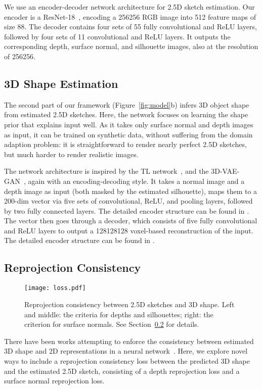 \documentclass{article}
\newcommand{\sect}[1]{Section~\ref{#1}}
\newcommand{\fig}[1]{Figure~\ref{#1}}
\begin{document}
We use an encoder-decoder network architecture for 2.5D sketch estimation. Our encoder is a ResNet-18~\citep{He2015}, encoding a 256256 RGB image into 512 feature maps of size 88. The decoder contains four sets of 55 fully convolutional and ReLU layers, followed by four sets of 11 convolutional and ReLU layers. It outputs the corresponding depth, surface normal, and silhouette images, also at the resolution of 256256. 

\subsection{3D Shape Estimation}
\label{sec:step2}

The second part of our framework (\fig{fig:model}b) infers 3D object shape from estimated 2.5D sketches. Here, the network focuses on learning the shape prior that explains input well. As it takes only surface normal and depth images as input, it can be trained on synthetic data, without suffering from the domain adaption problem: it is straightforward to render nearly perfect 2.5D sketches, but much harder to render realistic images. 

The network architecture is inspired by the TL network~\citep{Girdhar2016}, and the 3D-VAE-GAN~\citep{Wu2016}, again with an encoding-decoding style. It takes a normal image and a depth image as input (both masked by the estimated silhouette), maps them to a 200-dim vector via five sets of convolutional, ReLU, and pooling layers,  followed by two fully connected layers. The detailed encoder structure can be found in \cite{Girdhar2016}. The vector then goes through a decoder, which consists of five fully convolutional and ReLU layers to output a 128128128 voxel-based reconstruction of the input. The detailed encoder structure can be found in \cite{Wu2016}.

\subsection{Reprojection Consistency}
\label{sec:reprojection}

\begin{figure}[t]
    \centering
    \texttt{[image: loss.pdf]}
    \caption{Reprojection consistency between 2.5D sketches and 3D shape. Left and middle: the criteria for depths and silhouettes; right: the criterion for surface normals. See \sect{sec:reprojection} for details.}
    \vspace{-5pt}
    \label{fig:projection}
\end{figure} 
There have been works attempting to enforce the consistency between estimated 3D shape and 2D representations in a neural network~\citep{Yan2016,Rezende2016,Wu2016b,tulsiani2017multi}. Here, we explore novel ways to include a reprojection consistency loss between the predicted 3D shape and the estimated 2.5D sketch, consisting of a depth reprojection loss and a surface normal reprojection loss. 
\end{document}
